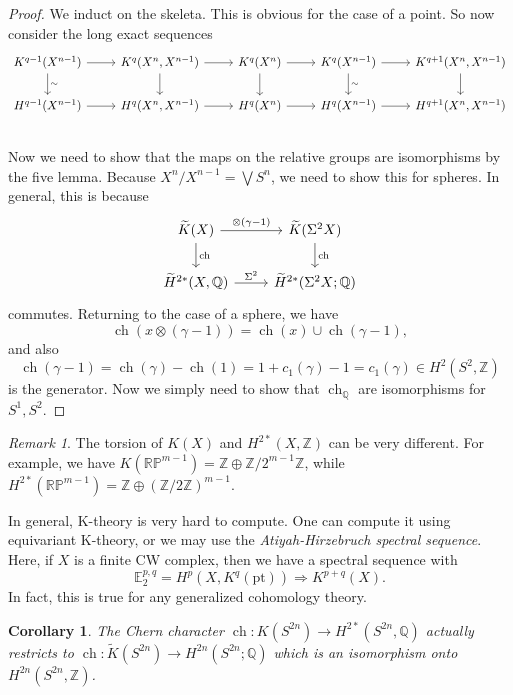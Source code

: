 \documentclass[leqno, openany]{memoir}
\newtheorem{cor}[thm]{Corollary}
\theoremstyle{definition}
\theoremstyle{remark}
\newtheorem{rmk}[thm]{Remark}
\theoremstyle{plain}
\theoremstyle{definition}
\theoremstyle{remark}
\newcommand{\R}{\mathbb{R}}
\newcommand{\E}{\mathbb{E}}
\newcommand{\Z}{\mathbb{Z}}
\newcommand{\Q}{\mathbb{Q}}
\renewcommand{\P}{\mathbb{P}}
\newcommand{\mr}[1]{\mathrm{#1}}
\newcommand{\wt}[1]{\widetilde{#1}}
\DeclareMathOperator{\ch}{ch}
\begin{document}
\begin{proof} We induct on the skeleta. This is obvious for the case of a
    point. So now consider the long exact sequences \begin{equation*}
        \begin{tikzcd} K^{q-1}(X^{n-1}) \ar{r} \ar{d}{\sim} & K^q(X^n, X^{n-1})
            \ar{d} \ar{r} & K^q(X^n) \ar{d} \ar{r} & K^q(X^{n-1})
            \ar{d}{\sim}\ar{r} & K^{q+1}(X^n, X^{n-1}) \ar{d} \\
        H^{q-1}(X^{n-1}) \ar{r} & H^q(X^n, X^{n-1}) \ar{r} & H^q(X^n) \ar{r} &
    H^q(X^{n-1}) \ar{r} & H^{q+1}(X^n, X^{n-1}) \\ \end{tikzcd} \end{equation*}
    Now we need to show that the maps on the relative groups are isomorphisms
    by the five lemma. Because $X^n/X^{n-1} = \bigvee S^n$, we need to show
    this for spheres. In general, this is because \begin{equation*}
        \begin{tikzcd} \wt{K}(X) \ar{r}{\otimes(\gamma-1)} \ar{d}{\ch} &
        \wt{K}(\Sigma^2 X) \ar{d}{\ch} \\ \wt{H}^{2*}(X, \Q) \ar{r}{\Sigma^2} &
    \wt{H}^{2*}(\Sigma^2 X; \Q) \end{tikzcd} \end{equation*} commutes.
    Returning to the case of a sphere, we have \[ \ch(x \otimes (\gamma - 1)) =
        \ch(x) \cup \ch(\gamma - 1), \] and also \[ \ch(\gamma - 1) =
    \ch(\gamma) - \ch(1) = 1 + c_1(\gamma) - 1 = c_1(\gamma) \in H^2(S^2, \Z)
\] is the generator. Now we simply need to show that $\ch_{\Q}$ are
isomorphisms for $S^1, S^2$.  \end{proof}

\begin{rmk} The torsion of $K(X)$ and $H^{2*}(X, \Z)$ can be very different.
For example, we have $K(\R\P^{m-1}) = \Z \oplus \Z/2^{m-1}\Z$, while
$H^{2*}(\R\P^{m-1}) = \Z \oplus {(\Z/2\Z)}^{m-1}$.  \end{rmk}

In general, K-theory is very hard to compute. One can compute it using
equivariant K-theory, or we may use the \textit{Atiyah-Hirzebruch spectral
sequence}. Here, if $X$ is a finite CW complex, then we have a spectral
sequence with \[ \E_2^{p,q} = H^p(X, K^q(\mr{pt})) \Rightarrow K^{p+q}(X). \]
In fact, this is true for any generalized cohomology theory.

\begin{cor} The Chern character $\ch \colon K(S^{2n}) \to H^{2*}(S^{2n}, \Q)$
actually restricts to $\ch \colon \wt{K}(S^{2n}) \to H^{2n}(S^{2n}; \Q)$ which
is an isomorphism onto $H^{2n}(S^{2n}, \Z)$.  \end{cor}
\end{document}

